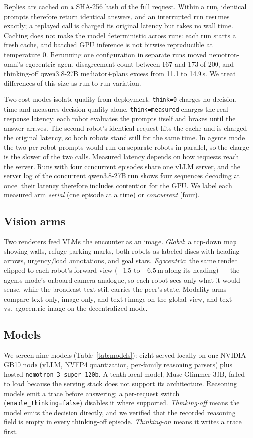 \documentclass[journal]{IEEEtran}
\begin{document}
Replies are cached on a SHA-256 hash of the full request. Within a run, identical prompts therefore return identical answers, and an interrupted run resumes exactly; a replayed call is charged its original latency but takes no wall time. Caching does not make the model deterministic across runs: each run starts a fresh cache, and batched GPU inference is not bitwise reproducible at temperature 0. Rerunning one configuration in separate runs moved nemotron-omni's egocentric-agent disagreement count between 167 and 173 of 200, and thinking-off qwen3.8-27B mediator+plans excess from 11.1 to 14.9\,s. We treat differences of this size as run-to-run variation.

Two cost modes isolate quality from deployment. \texttt{think=0} charges no decision time and measures decision quality alone. \texttt{think=measured} charges the real response latency: each robot evaluates the prompts itself and brakes until the answer arrives. The second robot's identical request hits the cache and is charged the original latency, so both robots stand still for the same time. In agents mode the two per-robot prompts would run on separate robots in parallel, so the charge is the slower of the two calls. Measured latency depends on how requests reach the server. Runs with four concurrent episodes share one vLLM server, and the server log of the concurrent qwen3.8-27B run shows four sequences decoding at once; their latency therefore includes contention for the GPU. We label each measured arm \emph{serial} (one episode at a time) or \emph{concurrent} (four).

\subsection{Vision arms}
Two renderers feed VLMs the encounter as an image. \emph{Global}: a top-down map showing walls, refuge parking marks, both robots as labeled discs with heading arrows, urgency/load annotations, and goal stars. \emph{Egocentric}: the same render clipped to each robot's forward view ($-1.5$ to $+6.5$\,m along its heading) --- the agents mode's onboard-camera analogue, so each robot sees only what it would sense, while the broadcast text still carries the peer's state. Modality arms compare text-only, image-only, and text+image on the global view, and text vs.\ egocentric image on the decentralized mode.

\subsection{Models}
We screen nine models (Table~\ref{tab:models}): eight served locally on one NVIDIA GB10 node (vLLM, NVFP4 quantization, per-family reasoning parsers) plus hosted \texttt{nemotron-3-super-120b}. A tenth local model, Muse-Glimmer-30B, failed to load because the serving stack does not support its architecture. Reasoning models emit a trace before answering; a per-request switch (\texttt{enable\_thinking=false}) disables it where supported. \emph{Thinking-off} means the model emits the decision directly, and we verified that the recorded reasoning field is empty in every thinking-off episode. \emph{Thinking-on} means it writes a trace first.
\end{document}
